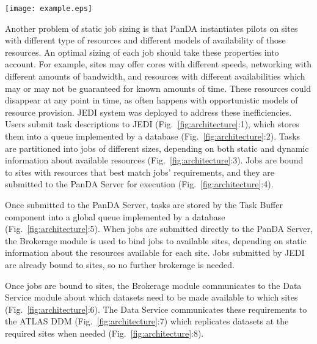 \begin{figure*}
  \texttt{[image: example.eps]}
\caption{PanDA WMS architecture. Numbers indicate the JEDI-based execution
process described in section \ref{subsec:implementation}. Several subsystems,
components, and architectural and communication details are abstracted to
improve clarity.}
\label{fig:architecture}
\end{figure*}


Another problem of static job sizing is that PanDA instantiates pilots on sites
with different type of resources and different models of availability of those
resources. An optimal sizing of each job should take these properties into
account. For example, sites may offer cores with different speeds, networking
with different amounts of bandwidth, and resources with different
availabilities which may or may not be guaranteed for known amounts of time.
These resources could disappear at any point in time, as often happens with
opportunistic models of resource provision. JEDI system was deployed to address
these inefficiencies. Users submit task descriptions to JEDI
(Fig.~\ref{fig:architecture}:1), which stores them into a queue implemented by
a database (Fig.~\ref{fig:architecture}:2). Tasks are partitioned into jobs of
different sizes, depending on both static and dynamic information about
available resources (Fig.~\ref{fig:architecture}:3). Jobs are bound to sites
with resources that best match jobs' requirements, and they are submitted to
the PanDA Server for execution (Fig.~\ref{fig:architecture}:4).

Once submitted to the PanDA Server, tasks are stored by the Task Buffer
component into a global queue implemented by a database
(Fig.~\ref{fig:architecture}:5). When jobs are submitted directly to the PanDA
Server, the Brokerage module is used to bind jobs to available sites, depending
on static information about the resources available for each site. Jobs
submitted by JEDI are already bound to sites, so no further brokerage is
needed.

Once jobs are bound to sites, the Brokerage module communicates to the Data
Service module about which datasets need to be made available to which sites
(Fig.~\ref{fig:architecture}:6). The Data Service communicates these
requirements to the ATLAS DDM (Fig.~\ref{fig:architecture}:7) which replicates
datasets at the required sites when needed (Fig.~\ref{fig:architecture}:8).

